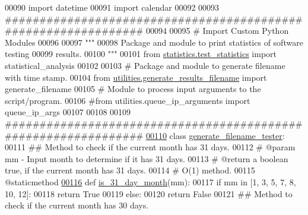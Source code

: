 \begin{DoxyCode}
00090 \textcolor{keyword}{import} datetime
00091 \textcolor{keyword}{import} calendar
00092 
00093 \textcolor{comment}{###############################################################}
00094 
00095 \textcolor{comment}{#   Import Custom Python Modules}
00096 
00097 \textcolor{stringliteral}{"""}
00098 \textcolor{stringliteral}{    Package and module to print statistics of software testing}
00099 \textcolor{stringliteral}{        results.}
00100 \textcolor{stringliteral}{"""}
00101 \textcolor{keyword}{from} \hyperlink{namespacestatistics_1_1test__statistics}{statistics.test\_statistics} \textcolor{keyword}{import} statistical\_analysis
00102 
00103 \textcolor{comment}{# Package and module to generate filename with time stamp.}
00104 \textcolor{keyword}{from} \hyperlink{namespaceutilities_1_1generate__results__filename}{utilities.generate\_results\_filename} \textcolor{keyword}{import} generate\_filename
00105 \textcolor{comment}{# Module to process input arguments to the script/program.}
00106 \textcolor{comment}{#from utilities.queue\_ip\_arguments import queue\_ip\_args}
00107 
00108 
00109 \textcolor{comment}{###############################################################}
\hypertarget{generate__results__filename__tester_8py_source_l00110}{}\hyperlink{classutilities_1_1generate__results__filename__tester_1_1generate__filename__tester}{00110} \textcolor{keyword}{class }\hyperlink{classutilities_1_1generate__results__filename__tester_1_1generate__filename__tester}{generate\_filename\_tester}:
00111     \textcolor{comment}{##  Method to check if the current month has 31 days.}
00112     \textcolor{comment}{#   @param mm - Input month to determine if it has 31 days.}
00113     \textcolor{comment}{#   @return a boolean true, if the current month has 31 days.}
00114     \textcolor{comment}{#   O(1) method.}
00115     @staticmethod
\hypertarget{generate__results__filename__tester_8py_source_l00116}{}\hyperlink{classutilities_1_1generate__results__filename__tester_1_1generate__filename__tester_a2f7f8ef1861b75a2b2a0ffe583bcdc81}{00116}     \textcolor{keyword}{def }\hyperlink{classutilities_1_1generate__results__filename__tester_1_1generate__filename__tester_a2f7f8ef1861b75a2b2a0ffe583bcdc81}{is\_31\_day\_month}(mm):
00117         \textcolor{keywordflow}{if} mm \textcolor{keywordflow}{in} [1, 3, 5, 7, 8, 10, 12]:
00118             \textcolor{keywordflow}{return} \textcolor{keyword}{True}
00119         \textcolor{keywordflow}{else}:
00120             \textcolor{keywordflow}{return} \textcolor{keyword}{False}
00121     \textcolor{comment}{##  Method to check if the current month has 30 days.}

\end{DoxyCode}
